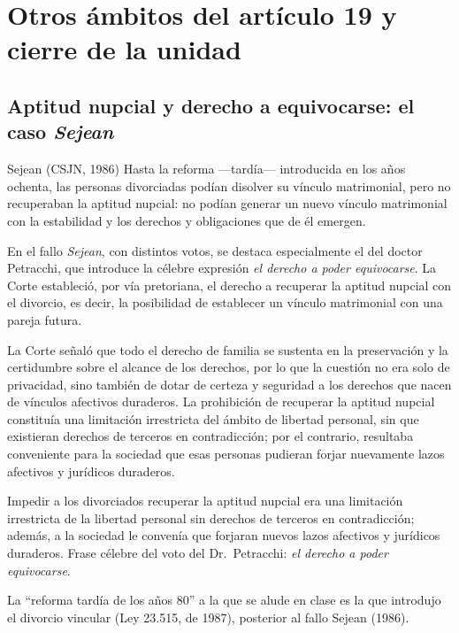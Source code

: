 \documentclass[12pt,oneside]{book}
\begin{document}
\chapter[Otros ámbitos del art.\ 19 y cierre]{Otros ámbitos del artículo 19 y cierre de la unidad}

\section{Aptitud nupcial y derecho a equivocarse: el caso \emph{Sejean}}

\begin{example}{Sejean (CSJN, 1986)}
Hasta la reforma —tardía— introducida en los años ochenta, las personas divorciadas podían disolver su vínculo matrimonial, pero no recuperaban la aptitud nupcial: no podían generar un nuevo vínculo matrimonial con la estabilidad y los derechos y obligaciones que de él emergen.

En el fallo \emph{Sejean}, con distintos votos, se destaca especialmente el del doctor Petracchi, que introduce la célebre expresión \emph{el derecho a poder equivocarse}. La Corte estableció, por vía pretoriana, el derecho a recuperar la aptitud nupcial con el divorcio, es decir, la posibilidad de establecer un vínculo matrimonial con una pareja futura.

La Corte señaló que todo el derecho de familia se sustenta en la preservación y la certidumbre sobre el alcance de los derechos, por lo que la cuestión no era solo de privacidad, sino también de dotar de certeza y seguridad a los derechos que nacen de vínculos afectivos duraderos. La prohibición de recuperar la aptitud nupcial constituía una limitación irrestricta del ámbito de libertad personal, sin que existieran derechos de terceros en contradicción; por el contrario, resultaba conveniente para la sociedad que esas personas pudieran forjar nuevamente lazos afectivos y jurídicos duraderos.
\end{example}

\begin{important}
Impedir a los divorciados recuperar la aptitud nupcial era una limitación irrestricta de la libertad personal sin derechos de terceros en contradicción; además, a la sociedad le convenía que forjaran nuevos lazos afectivos y jurídicos duraderos. Frase célebre del voto del Dr.\ Petracchi: \emph{el derecho a poder equivocarse}.
\end{important}

\begin{note}
La ``reforma tardía de los años 80'' a la que se alude en clase es la que introdujo el divorcio vincular (Ley 23.515, de 1987), posterior al fallo Sejean (1986).
\end{note}
\end{document}
